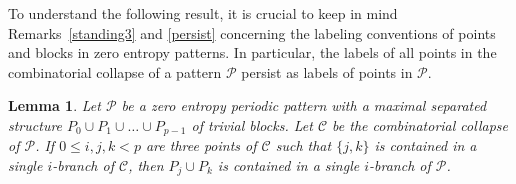 \documentclass[a4paper]{amsart}
\newtheorem{lemma}[theorem]{Lemma}
\theoremstyle{definition}
\begin{document}
To understand the following result, it is crucial to keep in mind Remarks~\ref{standing3} and \ref{persist} concerning the labeling conventions of points and blocks in zero entropy patterns. In particular, the labels of all points in the combinatorial collapse of a pattern $\mathcal{P}$ persist as labels of points in $\mathcal{P}$.

\begin{lemma}\label{isi2}
Let $\mathcal{P}$ be a zero entropy periodic pattern with a maximal separated structure $P_0\cup P_1\cup\ldots\cup P_{p-1}$ of trivial blocks. Let $\mathcal{C}$ be the combinatorial collapse of $\mathcal{P}$. If $0\le i,j,k<p$ are three points of $\mathcal{C}$ such that $\{j,k\}$ is contained in a single $i$-branch of $\mathcal{C}$, then $P_j\cup P_k$ is contained in a single $i$-branch of $\mathcal{P}$.
\end{lemma}
\end{document}

